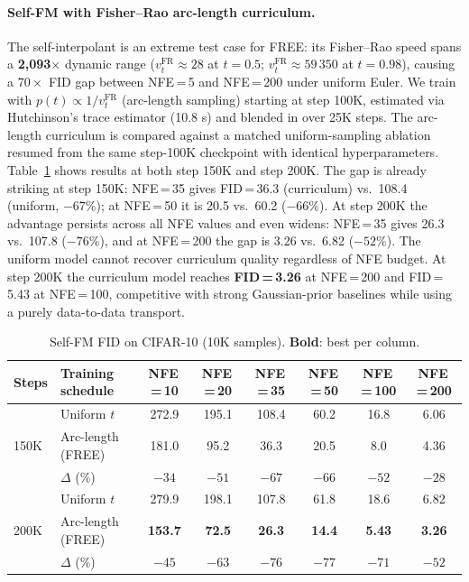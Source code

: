 \paragraph{Self-FM with Fisher--Rao arc-length curriculum.}
The self-interpolant is an extreme test case for FREE: its Fisher--Rao speed spans a \textbf{2,093$\times$} dynamic range ($v_t^{\mathrm{FR}} \approx 28$ at $t\!=\!0.5$; $v_t^{\mathrm{FR}} \approx 59\,350$ at $t\!=\!0.98$), causing a $70\times$ FID gap between NFE\,=\,5 and NFE\,=\,200 under uniform Euler.
We train with $p(t) \propto 1/v_t^{\mathrm{FR}}$ (arc-length sampling) starting at step 100K, estimated via Hutchinson's trace estimator (10.8 s) and blended in over 25K steps.
The arc-length curriculum is compared against a matched uniform-sampling ablation resumed from the same step-100K checkpoint with identical hyperparameters.
Table~\ref{tab:selffm} shows results at both step 150K and step 200K.
The gap is already striking at step 150K: NFE\,=\,35 gives FID\,=\,36.3 (curriculum) vs.\ 108.4 (uniform, $-67\%$); at NFE\,=\,50 it is 20.5 vs.\ 60.2 ($-66\%$).
At step 200K the advantage persists across all NFE values and even widens: NFE\,=\,35 gives 26.3 vs.\ 107.8 ($-76\%$), and at NFE\,=\,200 the gap is 3.26 vs.\ 6.82 ($-52\%$).
The uniform model cannot recover curriculum quality regardless of NFE budget.
At step 200K the curriculum model reaches \textbf{FID\,=\,3.26} at NFE\,=\,200 and FID\,=\,5.43 at NFE\,=\,100, competitive with strong Gaussian-prior baselines while using a purely data-to-data transport.

\begin{table}[h]
\centering
\small
\caption{Self-FM FID on CIFAR-10 (10K samples). \textbf{Bold}: best per column.}
\label{tab:selffm}
\begin{tabular}{llcccccc}
\toprule
Steps & Training schedule & NFE\,=\,10 & NFE\,=\,20 & NFE\,=\,35 & NFE\,=\,50 & NFE\,=\,100 & NFE\,=\,200 \\
\midrule
\multirow{3}{*}{150K}
  & Uniform $t$       & 272.9 & 195.1 & 108.4 & 60.2 & 16.8 & 6.06 \\
  & Arc-length (FREE) & 181.0 & 95.2  & 36.3  & 20.5 & 8.0  & 4.36 \\
  & $\Delta$ (\%)     & $-34$ & $-51$ & $-67$ & $-66$ & $-52$ & $-28$ \\
\midrule
\multirow{3}{*}{200K}
  & Uniform $t$       & 279.9 & 198.1 & 107.8 & 61.8 & 18.6 & 6.82 \\
  & Arc-length (FREE) & \textbf{153.7} & \textbf{72.5} & \textbf{26.3} & \textbf{14.4} & \textbf{5.43} & \textbf{3.26} \\
  & $\Delta$ (\%)     & $-45$ & $-63$ & $-76$ & $-77$ & $-71$ & $-52$ \\
\bottomrule
\end{tabular}
\end{table}

